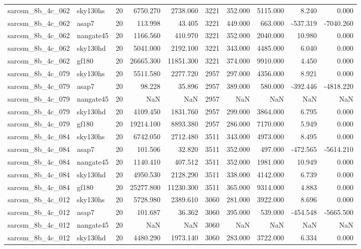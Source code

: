 \begin{longtable}{llrrrrrrrr}
sarcsm\_8b\_4c\_062 & sky130hs & 20 & 6750.270 & 2738.060 & 3221 & 352.000 & 5115.000 & 8.240 & 0.000 \\
sarcsm\_8b\_4c\_062 & asap7 & 20 & 113.998 & 43.405 & 3221 & 449.000 & 663.000 & -537.319 & -7040.260 \\
sarcsm\_8b\_4c\_062 & nangate45 & 20 & 1166.560 & 410.970 & 3221 & 352.000 & 2040.000 & 10.980 & 0.000 \\
sarcsm\_8b\_4c\_062 & sky130hd & 20 & 5041.000 & 2192.100 & 3221 & 343.000 & 4485.000 & 6.040 & 0.000 \\
sarcsm\_8b\_4c\_062 & gf180 & 20 & 26665.300 & 11851.300 & 3221 & 374.000 & 9910.000 & 4.450 & 0.000 \\
sarcsm\_8b\_4c\_079 & sky130hs & 20 & 5511.580 & 2277.720 & 2957 & 297.000 & 4356.000 & 8.921 & 0.000 \\
sarcsm\_8b\_4c\_079 & asap7 & 20 & 98.228 & 35.896 & 2957 & 389.000 & 580.000 & -392.446 & -4818.220 \\
sarcsm\_8b\_4c\_079 & nangate45 & 20 & NaN & NaN & 2957 & NaN & NaN & NaN & NaN \\
sarcsm\_8b\_4c\_079 & sky130hd & 20 & 4109.450 & 1831.760 & 2957 & 299.000 & 3864.000 & 6.795 & 0.000 \\
sarcsm\_8b\_4c\_079 & gf180 & 20 & 19214.100 & 8893.380 & 2957 & 286.000 & 7170.000 & 5.949 & 0.000 \\
sarcsm\_8b\_4c\_084 & sky130hs & 20 & 6742.050 & 2712.480 & 3511 & 343.000 & 4973.000 & 8.495 & 0.000 \\
sarcsm\_8b\_4c\_084 & asap7 & 20 & 101.506 & 32.820 & 3511 & 352.000 & 497.000 & -472.565 & -5614.210 \\
sarcsm\_8b\_4c\_084 & nangate45 & 20 & 1140.410 & 407.512 & 3511 & 352.000 & 1981.000 & 10.949 & 0.000 \\
sarcsm\_8b\_4c\_084 & sky130hd & 20 & 4950.530 & 2128.290 & 3511 & 338.000 & 4142.000 & 6.739 & 0.000 \\
sarcsm\_8b\_4c\_084 & gf180 & 20 & 25277.800 & 11230.300 & 3511 & 365.000 & 9314.000 & 4.883 & 0.000 \\
sarcsm\_8b\_4c\_012 & sky130hs & 20 & 5728.980 & 2389.610 & 3060 & 281.000 & 3922.000 & 8.696 & 0.000 \\
sarcsm\_8b\_4c\_012 & asap7 & 20 & 101.687 & 36.362 & 3060 & 395.000 & 539.000 & -454.548 & -5665.500 \\
sarcsm\_8b\_4c\_012 & nangate45 & 20 & NaN & NaN & 3060 & NaN & NaN & NaN & NaN \\
sarcsm\_8b\_4c\_012 & sky130hd & 20 & 4480.290 & 1973.140 & 3060 & 283.000 & 3722.000 & 6.334 & 0.000 \\

\end{longtable}

